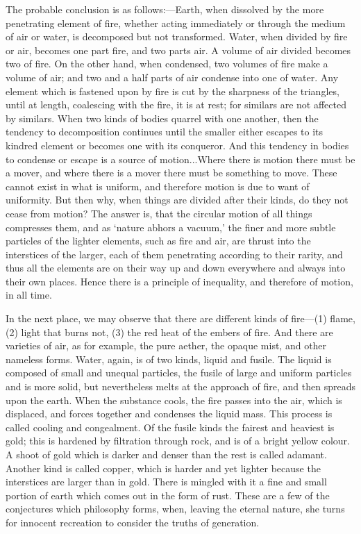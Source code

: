 The probable conclusion is as follows:—Earth, when dissolved by the
more penetrating element of fire, whether acting immediately or through
the medium of air or water, is decomposed but not transformed. Water, when
divided by fire or air, becomes one part fire, and two parts air. A volume
of air divided becomes two of fire. On the other hand, when condensed, two
volumes of fire make a volume of air; and two and a half parts of air
condense into one of water. Any element which is fastened upon by fire is
cut by the sharpness of the triangles, until at length, coalescing with
the fire, it is at rest; for similars are not affected by similars. When
two kinds of bodies quarrel with one another, then the tendency to
decomposition continues until the smaller either escapes to its kindred
element or becomes one with its conqueror. And this tendency in bodies to
condense or escape is a source of motion...Where there is motion there
must be a mover, and where there is a mover there must be something to
move. These cannot exist in what is uniform, and therefore motion is due
to want of uniformity. But then why, when things are divided after their
kinds, do they not cease from motion? The answer is, that the circular
motion of all things compresses them, and as ‘nature abhors a vacuum,’ the
finer and more subtle particles of the lighter elements, such as fire and
air, are thrust into the interstices of the larger, each of them
penetrating according to their rarity, and thus all the elements are on
their way up and down everywhere and always into their own places. Hence
there is a principle of inequality, and therefore of motion, in all time.

In the next place, we may observe that there are different kinds of fire—(1)
flame, (2) light that burns not, (3) the red heat of the embers of fire.
And there are varieties of air, as for example, the pure aether, the
opaque mist, and other nameless forms. Water, again, is of two kinds,
liquid and fusile. The liquid is composed of small and unequal particles,
the fusile of large and uniform particles and is more solid, but
nevertheless melts at the approach of fire, and then spreads upon the
earth. When the substance cools, the fire passes into the air, which is
displaced, and forces together and condenses the liquid mass. This process
is called cooling and congealment. Of the fusile kinds the fairest and
heaviest is gold; this is hardened by filtration through rock, and is of a
bright yellow colour. A shoot of gold which is darker and denser than the
rest is called adamant. Another kind is called copper, which is harder and
yet lighter because the interstices are larger than in gold. There is
mingled with it a fine and small portion of earth which comes out in the
form of rust. These are a few of the conjectures which philosophy forms,
when, leaving the eternal nature, she turns for innocent recreation to
consider the truths of generation.

